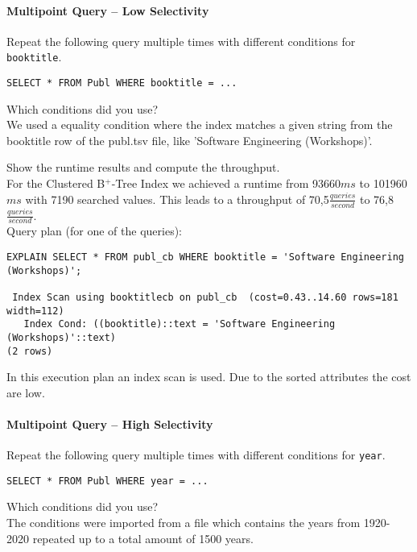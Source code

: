 \documentclass[11pt]{scrartcl}
\begin{document}
\paragraph{Multipoint Query -- Low Selectivity}

Repeat the following query multiple times with different conditions for {\tt booktitle}.

{\small
\begin{verbatim}
SELECT * FROM Publ WHERE booktitle = ...
\end{verbatim}
}

\noindent
Which conditions did you use?\\
We used a equality condition where the index matches a given string from the booktitle row of the publ.tsv file, like 'Software Engineering (Workshops)'.

\smallskip\noindent
Show the runtime results and compute the throughput.\\
For the Clustered B$^+$-Tree Index we achieved a runtime from 93660$ms$ to 101960$ms$ with 7190 searched values.
This leads to a throughput of 70,5$\frac{queries}{second}$ to 76,8$\frac{queries}{second}$.\\

Query plan (for one of the queries):
\begin{verbatim}
EXPLAIN SELECT * FROM publ_cb WHERE booktitle = 'Software Engineering (Workshops)';

 Index Scan using booktitlecb on publ_cb  (cost=0.43..14.60 rows=181 width=112)
   Index Cond: ((booktitle)::text = 'Software Engineering (Workshops)'::text)
(2 rows)
\end{verbatim}

In this execution plan an index scan is used. Due to the sorted attributes the cost are low.

\paragraph{Multipoint Query -- High Selectivity}

Repeat the following query multiple times with different conditions for {\tt year}.

{\small
\begin{verbatim}
SELECT * FROM Publ WHERE year = ...
\end{verbatim}
}

\noindent
Which conditions did you use?\\
The conditions were imported from a file which contains the years from 1920-2020 repeated up to a total amount of 1500 years.
\end{document}
